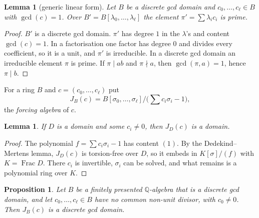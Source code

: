 \documentclass[11pt]{article}
\newcommand{\Q}{\mathbb{Q}}
\numberwithin{equation}{section}
\theoremstyle{plain}
\newtheorem{proposition}[theorem]{Proposition}
\newtheorem{lemma}[theorem]{Lemma}
\theoremstyle{definition}
\theoremstyle{remark}
\begin{document}
\begin{lemma}[generic linear form]\label{l:generic}
Let $B$ be a discrete gcd domain and $c_0,\dots,c_\ell\in B$ with $\gcd(c)=1$. Over
$B'=B[\lambda_0,\dots,\lambda_\ell]$ the element $\pi'=\sum\lambda_ic_i$ is prime.
\end{lemma}

\begin{proof}
$B'$ is a discrete gcd domain. $\pi'$ has degree $1$ in the $\lambda$'s and content $\gcd(c)=1$. In a
factorisation one factor has degree $0$ and divides every coefficient, so it is a unit, and $\pi'$
is irreducible. In a discrete gcd domain an irreducible element $\pi$ is prime. If $\pi\mid ab$ and
$\pi\nmid a$, then $\gcd(\pi,a)=1$, hence $\pi\mid b$.
\end{proof}

For a ring $B$ and $c=(c_0,\dots,c_\ell)$ put
\[
J_B(c)=B[\sigma_0,\dots,\sigma_\ell]\Big/\Big(\sum c_i\sigma_i-1\Big),
\]
the \emph{forcing algebra} of $c$.

\begin{lemma}\label{l:jdomain}
If $D$ is a domain and some $c_i\ne0$, then $J_D(c)$ is a domain.
\end{lemma}

\begin{proof}
The polynomial $f=\sum c_i\sigma_i-1$ has content $(1)$. By the Dedekind--Mertens lemma, $J_D(c)$ is
torsion-free over $D$, so it embeds in $K[\sigma]/(f)$ with $K=\operatorname{Frac}D$. There $c_i$
is invertible, $\sigma_i$ can be solved, and what remains is a polynomial ring over $K$.
\end{proof}

\begin{proposition}\label{p:jgcd}
Let $B$ be a finitely presented $\Q$-algebra that is a discrete gcd domain, and let
$c_0,\dots,c_\ell\in B$ have no common non-unit divisor, with $c_0\ne0$. Then $J_B(c)$ is a discrete
gcd domain.
\end{proposition}
\end{document}

